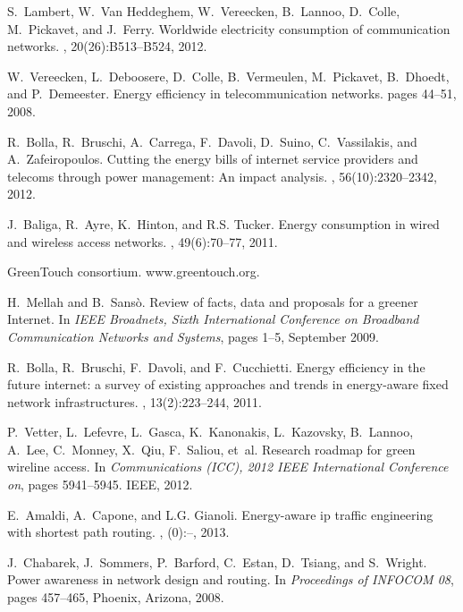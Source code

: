 \documentclass[final,5p,times,twocolumn]{elsarticle}
\begin{document}
\begin{thebibliography}{10}

S.~Lambert, W.~Van Heddeghem, W.~Vereecken, B.~Lannoo, D.~Colle, M.~Pickavet,
  and J.~Ferry.
\newblock Worldwide electricity consumption of communication networks.
, 20(26):B513--B524, 2012.

W.~Vereecken, L.~Deboosere, D.~Colle, B.~Vermeulen, M.~Pickavet, B.~Dhoedt, and
  P.~Demeester.
\newblock Energy efficiency in telecommunication networks.
\newblock pages 44--51, 2008.

R.~Bolla, R.~Bruschi, A.~Carrega, F.~Davoli, D.~Suino, C.~Vassilakis, and
  A.~Zafeiropoulos.
\newblock Cutting the energy bills of internet service providers and telecoms
  through power management: An impact analysis.
, 56(10):2320--2342, 2012.

J.~Baliga, R.~Ayre, K.~Hinton, and R.S. Tucker.
\newblock Energy consumption in wired and wireless access networks.
, 49(6):70--77, 2011.

{GreenTouch consortium}.
\newblock www.greentouch.org.

H.~Mellah and B.~Sans\`o.
\newblock Review of facts, data and proposals for a greener {I}nternet.
\newblock In {\em IEEE Broadnets, Sixth International Conference on Broadband
  Communication Networks and Systems}, pages 1--5, September 2009.

R.~Bolla, R.~Bruschi, F.~Davoli, and F.~Cucchietti.
\newblock Energy efficiency in the future internet: a survey of existing
  approaches and trends in energy-aware fixed network infrastructures.
, 13(2):223--244,
  2011.

P.~Vetter, L.~Lefevre, L.~Gasca, K.~Kanonakis, L.~Kazovsky, B.~Lannoo, A.~Lee,
  C.~Monney, X.~Qiu, F.~Saliou, et~al.
\newblock Research roadmap for green wireline access.
\newblock In {\em Communications (ICC), 2012 IEEE International Conference on},
  pages 5941--5945. IEEE, 2012.

E.~Amaldi, A.~Capone, and L.G. Gianoli.
\newblock Energy-aware ip traffic engineering with shortest path routing.
, (0):--, 2013.

J.~Chabarek, J.~Sommers, P.~Barford, C.~Estan, D.~Tsiang, and S.~Wright.
\newblock Power awareness in network design and routing.
\newblock In {\em Proceedings of INFOCOM 08}, pages 457--465, Phoenix, Arizona,
  2008.


\end{thebibliography}
\end{document}

